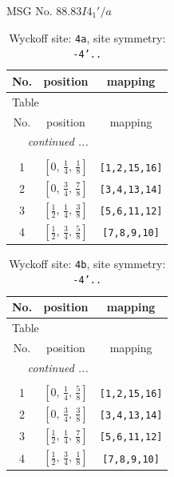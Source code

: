 \documentclass[fleqn,8pt]{jsarticle}
\begin{document}
\setcounter{MaxMatrixCols}{32}

\renewcommand{\tablename}{Table~}
\renewcommand{\figurename}{Figure~}
\begin{center}
\LARGE
MSG No. 88.83\quad$I4_{1}'/a$
\end{center}
\renewcommand{\arraystretch}{1.2}
\begin{longtable}{ccc}
\caption{Wyckoff site: {\tt 4a}, site symmetry: {\tt -4'..}}
 \\
 \hline \hline
No. & position & mapping \\ \hline \endfirsthead

\multicolumn{2}{l}{\tablename\ \thetable{}} \\
 \hline \hline
No. & position & mapping \\ \hline \endhead

 \hline \hline
\multicolumn{2}{r}{\footnotesize\it continued ...} \\ \endfoot

 \hline \hline
\multicolumn{2}{r}{} \\ \endlastfoot

1 & $\left[ 0,\, \frac{1}{4},\, \frac{1}{8} \right]$ & {\tt [1,2,15,16]} \\ \hline
2 & $\left[ 0,\, \frac{3}{4},\, \frac{7}{8} \right]$ & {\tt [3,4,13,14]} \\ \hline
3 & $\left[ \frac{1}{2},\, \frac{1}{4},\, \frac{3}{8} \right]$ & {\tt [5,6,11,12]} \\ \hline
4 & $\left[ \frac{1}{2},\, \frac{3}{4},\, \frac{5}{8} \right]$ & {\tt [7,8,9,10]} \\
\end{longtable}
\renewcommand{\arraystretch}{1.2}
\begin{longtable}{ccc}
\caption{Wyckoff site: {\tt 4b}, site symmetry: {\tt -4'..}}
 \\
 \hline \hline
No. & position & mapping \\ \hline \endfirsthead

\multicolumn{2}{l}{\tablename\ \thetable{}} \\
 \hline \hline
No. & position & mapping \\ \hline \endhead

 \hline \hline
\multicolumn{2}{r}{\footnotesize\it continued ...} \\ \endfoot

 \hline \hline
\multicolumn{2}{r}{} \\ \endlastfoot

1 & $\left[ 0,\, \frac{1}{4},\, \frac{5}{8} \right]$ & {\tt [1,2,15,16]} \\ \hline
2 & $\left[ 0,\, \frac{3}{4},\, \frac{3}{8} \right]$ & {\tt [3,4,13,14]} \\ \hline
3 & $\left[ \frac{1}{2},\, \frac{1}{4},\, \frac{7}{8} \right]$ & {\tt [5,6,11,12]} \\ \hline
4 & $\left[ \frac{1}{2},\, \frac{3}{4},\, \frac{1}{8} \right]$ & {\tt [7,8,9,10]} \\
\end{longtable}
\end{document}
